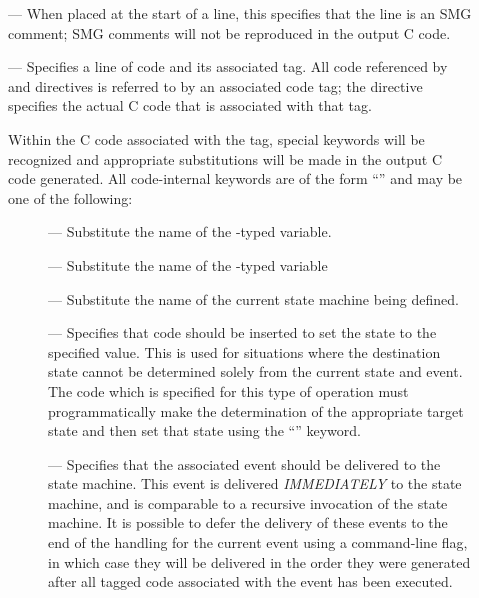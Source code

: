 \begin{description}
\item[\smg{##}] --- When placed at the start of a line, this specifies
  that the line is an SMG comment; SMG comments will not be reproduced
  in the output C code.
  
\item[\hypertarget{CODE}{}] --- Specifies a line of code and its associated tag.
  All code referenced by \EVENT and \TRANS directives is
  referred to by an associated code tag; the  directive
  specifies the actual C code that is associated with that tag.
  
  Within the C code associated with the  tag, special
  keywords will be recognized and appropriate substitutions will be
  made in the output C code generated.  All code-internal keywords are
  of the form ``'' and may be one of the following:

\begin{description}
  
\item[] --- Substitute the name of the \SMOBJ-typed
  variable.
  
\item[] --- Substitute the name of the \SMEVT-typed
  variable
  
\item[] --- Substitute the name of the current state machine
  being defined.
  
\item[] --- Specifies that code should be inserted to set
  the state to the specified value.  This is used for situations where
  the destination state cannot be determined solely from the current
  state and event.  The code which is specified for this type of
  \TRANS operation must programmatically make the determination
  of the appropriate target state and then set that state using the
  ``'' keyword.
  
\item[] --- Specifies that the associated event should be
  delivered to the state machine.  This event is delivered
  {\em IMMEDIATELY} to the state machine, and is comparable to a
  recursive invocation of the state machine.  It is possible to defer
  the delivery of these events to the end of the handling for the
  current event using a command-line flag, in which case they will be
  delivered in the order they were generated after all tagged code
  associated with the event has been executed.
  

\end{description}
\end{description}
